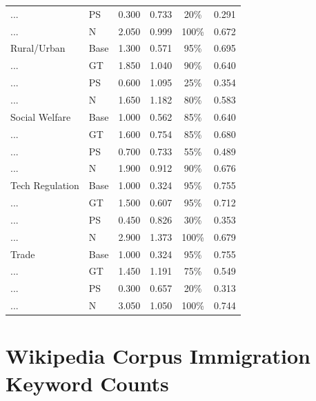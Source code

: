 \documentclass{article}
\begin{document}
\begin{longtable}{llcccc}
    ...              & PS   & 0.300 & 0.733 & 20\% & 0.291 \\
    ...              & N    & 2.050 & 0.999 & 100\% & 0.672 \\
    \addlinespace
    Rural/Urban      & Base & 1.300 & 0.571 & 95\% & 0.695 \\
    ...              & GT   & 1.850 & 1.040 & 90\% & 0.640 \\
    ...              & PS   & 0.600 & 1.095 & 25\% & 0.354 \\
    ...              & N    & 1.650 & 1.182 & 80\% & 0.583 \\
    \addlinespace
    Social Welfare   & Base & 1.000 & 0.562 & 85\% & 0.640 \\
    ...              & GT   & 1.600 & 0.754 & 85\% & 0.680 \\
    ...              & PS   & 0.700 & 0.733 & 55\% & 0.489 \\
    ...              & N    & 1.900 & 0.912 & 90\% & 0.676 \\
    \addlinespace
    Tech Regulation  & Base & 1.000 & 0.324 & 95\% & 0.755 \\
    ...              & GT   & 1.500 & 0.607 & 95\% & 0.712 \\
    ...              & PS   & 0.450 & 0.826 & 30\% & 0.353 \\
    ...              & N    & 2.900 & 1.373 & 100\% & 0.679 \\
    \addlinespace
    Trade            & Base & 1.000 & 0.324 & 95\% & 0.755 \\
    ...              & GT   & 1.450 & 1.191 & 75\% & 0.549 \\
    ...              & PS   & 0.300 & 0.657 & 20\% & 0.313 \\
    ...              & N    & 3.050 & 1.050 & 100\% & 0.744 \\
\end{longtable}

\section{Wikipedia Corpus Immigration Keyword Counts}
\end{document}
